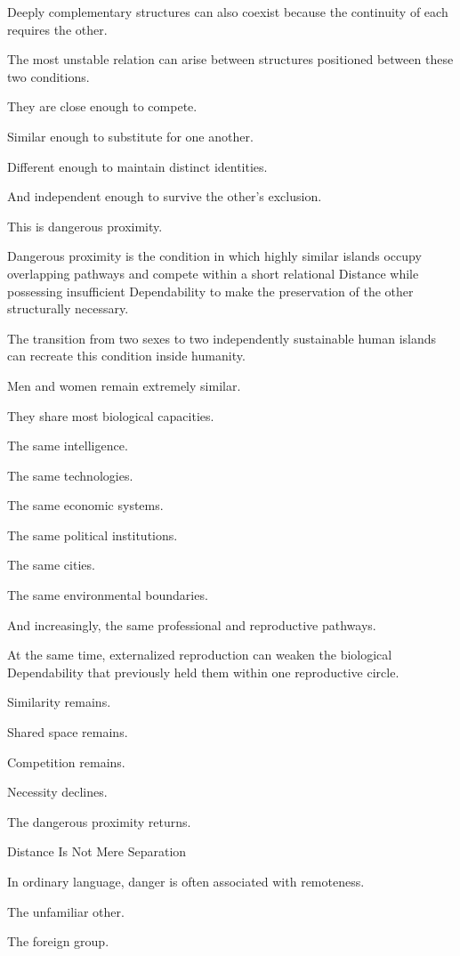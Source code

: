 Deeply complementary structures can also coexist because the continuity of each requires the other.

The most unstable relation can arise between structures positioned between these two conditions.

They are close enough to compete.

Similar enough to substitute for one another.

Different enough to maintain distinct identities.

And independent enough to survive the other’s exclusion.

This is dangerous proximity.

Dangerous proximity is the condition in which highly similar islands occupy overlapping pathways and compete within a short relational Distance while possessing insufficient Dependability to make the preservation of the other structurally necessary.

The transition from two sexes to two independently sustainable human islands can recreate this condition inside humanity.

Men and women remain extremely similar.

They share most biological capacities.

The same intelligence.

The same technologies.

The same economic systems.

The same political institutions.

The same cities.

The same environmental boundaries.

And increasingly, the same professional and reproductive pathways.

At the same time, externalized reproduction can weaken the biological Dependability that previously held them within one reproductive circle.

Similarity remains.

Shared space remains.

Competition remains.

Necessity declines.

The dangerous proximity returns.

Distance Is Not Mere Separation

In ordinary language, danger is often associated with remoteness.

The unfamiliar other.

The foreign group.

